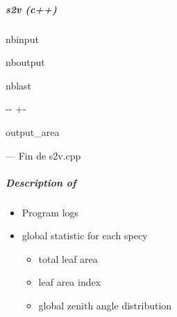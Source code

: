 \documentclass[letterpaper,10pt,english]{sphinxmanual}
\begin{document}
\subparagraph{s2v (c++)}
\label{\detokenize{misc_functionnalities:s2v-(c++)}}
\begin{sphinxuseclass}{nbinput}
{
\begin{sphinxVerbatim}[commandchars=\\\{\}]
\llap{\color{nbsphinxin}[11]:\,\hspace{\fboxrule}\hspace{\fboxsep}}
\end{sphinxVerbatim}
}

\end{sphinxuseclass}
\begin{sphinxuseclass}{nboutput}
\begin{sphinxuseclass}{nblast}
{

\kern-\sphinxverbatimsmallskipamount\kern-\baselineskip
\kern+\FrameHeightAdjust\kern-\fboxrule
\vspace{\nbsphinxcodecellspacing}

\begin{sphinxuseclass}{output_area}
\begin{sphinxuseclass}{}


\begin{sphinxVerbatim}[commandchars=\\\{\}]
--- Fin de s2v.cpp
\end{sphinxVerbatim}



\end{sphinxuseclass}
\end{sphinxuseclass}
}

\end{sphinxuseclass}
\end{sphinxuseclass}

\subparagraph{Description of }
\label{\detokenize{misc_functionnalities:Description-of-s2v.log}}\begin{itemize}
\item {} 
\sphinxAtStartPar
Program logs

\item {} 
\sphinxAtStartPar
global statistic for each specy
\begin{itemize}
\item {} 
\sphinxAtStartPar
total leaf area

\item {} 
\sphinxAtStartPar
leaf area index

\item {} 
\sphinxAtStartPar
global zenith angle distribution

\end{itemize}

\end{itemize}
\end{document}
